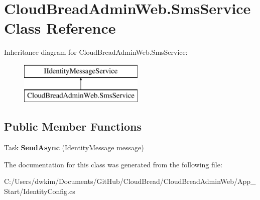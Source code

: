 \hypertarget{class_cloud_bread_admin_web_1_1_sms_service}{}\section{Cloud\+Bread\+Admin\+Web.\+Sms\+Service Class Reference}
\label{class_cloud_bread_admin_web_1_1_sms_service}
Inheritance diagram for Cloud\+Bread\+Admin\+Web.\+Sms\+Service\+:\begin{figure}[H]
\begin{center}
\leavevmode
\includegraphics[height=2.000000cm]{class_cloud_bread_admin_web_1_1_sms_service}
\end{center}
\end{figure}
\subsection*{Public Member Functions}
\begin{DoxyCompactItemize}
\item 
Task {\bfseries Send\+Async} (Identity\+Message message)\hypertarget{class_cloud_bread_admin_web_1_1_sms_service_af0f1e898dd0ecdb4647e53338f478b4b}{}\label{class_cloud_bread_admin_web_1_1_sms_service_af0f1e898dd0ecdb4647e53338f478b4b}

\end{DoxyCompactItemize}


The documentation for this class was generated from the following file\+:\begin{DoxyCompactItemize}
\item 
C\+:/\+Users/dwkim/\+Documents/\+Git\+Hub/\+Cloud\+Bread/\+Cloud\+Bread\+Admin\+Web/\+App\+\_\+\+Start/Identity\+Config.\+cs\end{DoxyCompactItemize}
